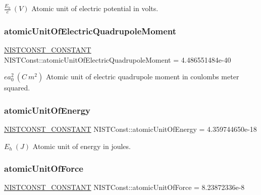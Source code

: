 $ \frac{E_h}{e}\ (V)$ Atomic unit of electric potential in volts. \mbox{\label{group___n_i_s_t_const-_atomic_unit_ga4714cce6077b09c5fd2dbcb3efa95d5b}} 
\subsubsection{\texorpdfstring{atomic\+Unit\+Of\+Electric\+Quadrupole\+Moment}{atomicUnitOfElectricQuadrupoleMoment}}
{\footnotesize\ttfamily \mbox{\hyperlink{group___n_i_s_t_const-_macros_ga2b0fc1d7452373f816175dd86ce26729}{N\+I\+S\+T\+C\+O\+N\+S\+T\+\_\+\+C\+O\+N\+S\+T\+A\+NT}} N\+I\+S\+T\+Const\+::atomic\+Unit\+Of\+Electric\+Quadrupole\+Moment = 4.\+486551484e-\/40}

$e a_0^2 \ (C\ m^2)$ Atomic unit of electric quadrupole moment in coulombs meter squared. \mbox{\label{group___n_i_s_t_const-_atomic_unit_gafa7ea08448d60570f5a6f2c6938bc8fc}} 
\subsubsection{\texorpdfstring{atomic\+Unit\+Of\+Energy}{atomicUnitOfEnergy}}
{\footnotesize\ttfamily \mbox{\hyperlink{group___n_i_s_t_const-_macros_ga2b0fc1d7452373f816175dd86ce26729}{N\+I\+S\+T\+C\+O\+N\+S\+T\+\_\+\+C\+O\+N\+S\+T\+A\+NT}} N\+I\+S\+T\+Const\+::atomic\+Unit\+Of\+Energy = 4.\+359744650e-\/18}

$E_h \ (J)$ Atomic unit of energy in joules. \mbox{\label{group___n_i_s_t_const-_atomic_unit_gaf1da533cf2e7a57f1b0b87613ddea807}} 
\subsubsection{\texorpdfstring{atomic\+Unit\+Of\+Force}{atomicUnitOfForce}}
{\footnotesize\ttfamily \mbox{\hyperlink{group___n_i_s_t_const-_macros_ga2b0fc1d7452373f816175dd86ce26729}{N\+I\+S\+T\+C\+O\+N\+S\+T\+\_\+\+C\+O\+N\+S\+T\+A\+NT}} N\+I\+S\+T\+Const\+::atomic\+Unit\+Of\+Force = 8.\+23872336e-\/8}

